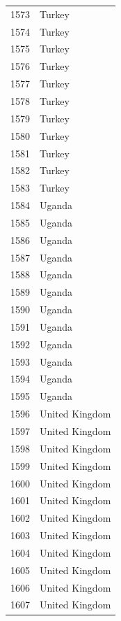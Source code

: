 \documentclass[
  letterpaper,
  DIV=11,
  numbers=noendperiod]{scrreprt}
\begin{document}
\begin{tabular}{ll}
1573 &                    Turkey \\
1574 &                    Turkey \\
1575 &                    Turkey \\
1576 &                    Turkey \\
1577 &                    Turkey \\
1578 &                    Turkey \\
1579 &                    Turkey \\
1580 &                    Turkey \\
1581 &                    Turkey \\
1582 &                    Turkey \\
1583 &                    Turkey \\
1584 &                    Uganda \\
1585 &                    Uganda \\
1586 &                    Uganda \\
1587 &                    Uganda \\
1588 &                    Uganda \\
1589 &                    Uganda \\
1590 &                    Uganda \\
1591 &                    Uganda \\
1592 &                    Uganda \\
1593 &                    Uganda \\
1594 &                    Uganda \\
1595 &                    Uganda \\
1596 &            United Kingdom \\
1597 &            United Kingdom \\
1598 &            United Kingdom \\
1599 &            United Kingdom \\
1600 &            United Kingdom \\
1601 &            United Kingdom \\
1602 &            United Kingdom \\
1603 &            United Kingdom \\
1604 &            United Kingdom \\
1605 &            United Kingdom \\
1606 &            United Kingdom \\
1607 &            United Kingdom \\

\end{tabular}
\end{document}
